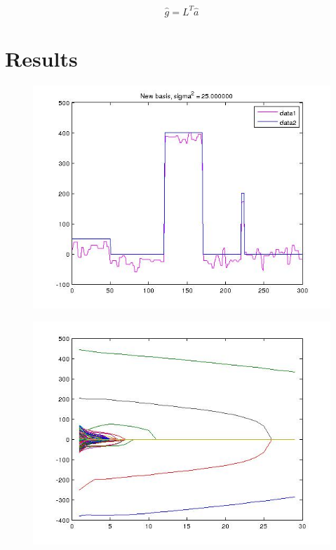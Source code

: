 \documentclass{article}
\begin{document}
\begin{equation}
\hat{g} = L^{T} \hat{a}
\end{equation}


\section{Results}

\begin{figure}[h]
\centering
\includegraphics[height = 7.3 cm]{new_basis_25.jpg}
\caption{}
\label{fig:new_basis_25}
\end{figure}

\begin{figure}[h]
\centering
\includegraphics[height = 7.3 cm]{new_basis_different_lambdas.jpg}
\caption{}
\label{fig:new_basis_25}
\end{figure}
\end{document}
